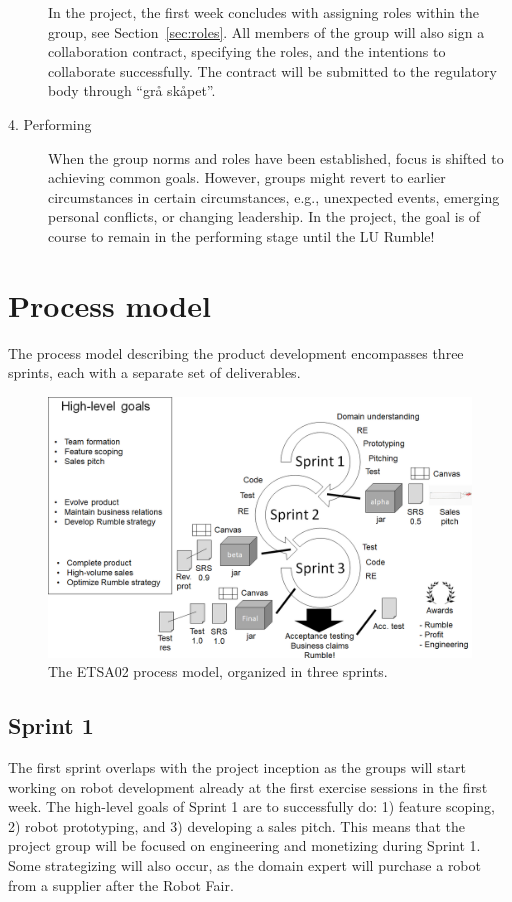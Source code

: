 \documentclass{scrreprt}
\begin{document}
\begin{description}
In the project, the first week concludes with assigning roles within the group, see Section~\ref{sec:roles}. All members of the group will also sign a collaboration contract, specifying the roles, and the intentions to collaborate successfully. The contract will be submitted to the regulatory body through ``grå skåpet''.
\item[4. Performing] When the group norms and roles have been established, focus is shifted to achieving common goals. However, groups might revert to earlier circumstances in certain circumstances, e.g., unexpected events, emerging personal conflicts, or changing leadership. In the project, the goal is of course to remain in the performing stage until the LU Rumble!
\end{description}

\section{Process model} \label{sec:process}
The process model describing the product development encompasses three sprints, each with a separate set of deliverables. 

\begin{figure}
\centering
\includegraphics[width=1.0\textwidth]{figures/processModel.png}
\caption{The ETSA02 process model, organized in three sprints.}
\label{fig:overview}
\end{figure}

\subsection{Sprint 1}
The first sprint overlaps with the project inception as the groups will start working on robot development already at the first exercise sessions in the first week. The high-level goals of Sprint 1 are to successfully do: 1) feature scoping, 2) robot prototyping, and 3) developing a sales pitch. This means that the project group will be focused on engineering and monetizing during Sprint 1. Some strategizing will also occur, as the domain expert will purchase a robot from a supplier after the Robot Fair.
\end{document}
